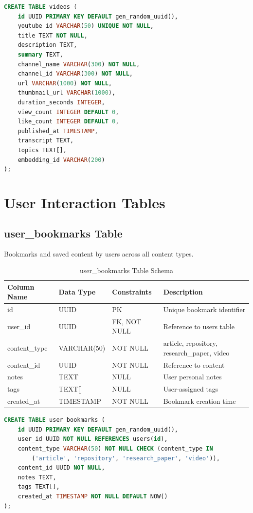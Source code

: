 \documentclass[12pt,a4paper]{report}
\begin{document}
\begin{lstlisting}[language=SQL,basicstyle=\ttfamily\small]
CREATE TABLE videos (
    id UUID PRIMARY KEY DEFAULT gen_random_uuid(),
    youtube_id VARCHAR(50) UNIQUE NOT NULL,
    title TEXT NOT NULL,
    description TEXT,
    summary TEXT,
    channel_name VARCHAR(300) NOT NULL,
    channel_id VARCHAR(300) NOT NULL,
    url VARCHAR(1000) NOT NULL,
    thumbnail_url VARCHAR(1000),
    duration_seconds INTEGER,
    view_count INTEGER DEFAULT 0,
    like_count INTEGER DEFAULT 0,
    published_at TIMESTAMP,
    transcript TEXT,
    topics TEXT[],
    embedding_id VARCHAR(200)
);
\end{lstlisting}

\newpage

\chapter{User Interaction Tables}

\section{user\_bookmarks Table}

Bookmarks and saved content by users across all content types.

\begin{table}[h]
\centering
\small
\caption{user\_bookmarks Table Schema}
\begin{tabular}{|l|l|l|l|}
\toprule
\textbf{Column Name} & \textbf{Data Type} & \textbf{Constraints} & \textbf{Description} \\
\midrule
id & UUID & PK & Unique bookmark identifier \\
user\_id & UUID & FK, NOT NULL & Reference to users table \\
content\_type & VARCHAR(50) & NOT NULL & article, repository, research\_paper, video \\
content\_id & UUID & NOT NULL & Reference to content \\
notes & TEXT & NULL & User personal notes \\
tags & TEXT[] & NULL & User-assigned tags \\
created\_at & TIMESTAMP & NOT NULL & Bookmark creation time \\
\bottomrule
\end{tabular}
\end{table}

\begin{lstlisting}[language=SQL,basicstyle=\ttfamily\small]
CREATE TABLE user_bookmarks (
    id UUID PRIMARY KEY DEFAULT gen_random_uuid(),
    user_id UUID NOT NULL REFERENCES users(id),
    content_type VARCHAR(50) NOT NULL CHECK (content_type IN 
        ('article', 'repository', 'research_paper', 'video')),
    content_id UUID NOT NULL,
    notes TEXT,
    tags TEXT[],
    created_at TIMESTAMP NOT NULL DEFAULT NOW()
);
\end{lstlisting}
\end{document}
